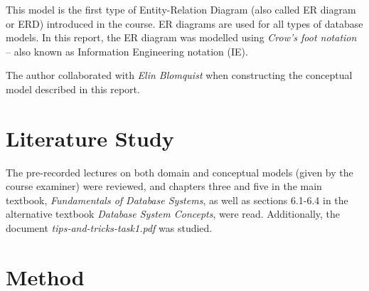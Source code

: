 \documentclass[a4paper]{scrartcl}
\begin{document}
This model is the first type of Entity-Relation Diagram (also called ER diagram or
ERD) introduced in the course. 
ER diagrams are used for all types of database
models.  
In this report, the ER diagram was modelled using \emph{Crow's foot notation}
-- also known as Information Engineering notation (IE).

The author collaborated with
\emph{Elin Blomquist}
when constructing the conceptual model described in this report.



\section{Literature Study}


The pre-recorded lectures on both domain and conceptual models (given by the course examiner) were reviewed, 
and chapters three and five in the main textbook, 
\emph{Fundamentals of Database Systems},%
as well as sections 6.1-6.4 in the alternative textbook 
\emph{Database System Concepts}, 
were read. 
Additionally, the document 
\emph{tips-and-tricks-task1.pdf} %
was studied.

\section{Method}
\label{sec:method}

\end{document}
